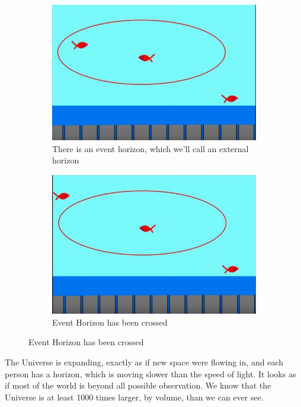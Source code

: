 \documentclass[]{article}
\begin{document}
\begin{figure}[H]
	\caption{Alice and Bob are communicating, but they are separating.}
	\begin{subfigure}[t]{0.45\textwidth}
		\caption{There is an event horizon, which we'll call an external horizon}
		\includegraphics[width=\textwidth]{wh-cosmology1}
	\end{subfigure}
	\begin{subfigure}[t]{0.45\textwidth}
		\caption{Event Horizon has been crossed}
		\includegraphics[width=\textwidth]{wh-cosmology2}
	\end{subfigure}
\end{figure}

The Universe is expanding, exactly as if new space were flowing in, and each person has a horizon, which is moving slower than the speed of light. It looks as if most of the world is beyond all possible observation. We know that the Universe is at least 1000 times larger, by volume, than we can ever see.
\end{document}
